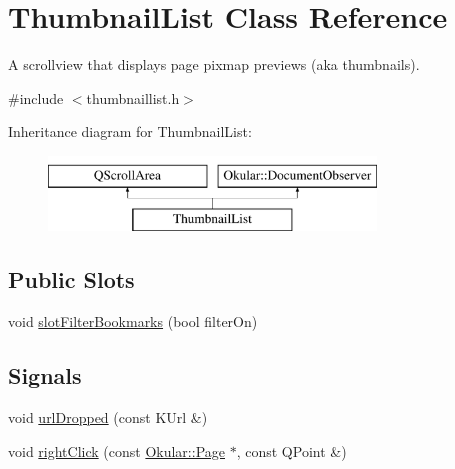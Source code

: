 \hypertarget{classThumbnailList}{\section{Thumbnail\+List Class Reference}
\label{classThumbnailList}
}


A scrollview that displays page pixmap previews (aka thumbnails).  




{\ttfamily \#include $<$thumbnaillist.\+h$>$}

Inheritance diagram for Thumbnail\+List\+:\begin{figure}[H]
\begin{center}
\leavevmode
\includegraphics[height=2.000000cm]{classThumbnailList}
\end{center}
\end{figure}
\subsection*{Public Slots}
\begin{DoxyCompactItemize}
\item 
void \hyperlink{classThumbnailList_aa87ec39d6085e009402f560e01f86a09}{slot\+Filter\+Bookmarks} (bool filter\+On)
\end{DoxyCompactItemize}
\subsection*{Signals}
\begin{DoxyCompactItemize}
\item 
void \hyperlink{classThumbnailList_ae23ce1aaf766a0633cbee9d8c8185903}{url\+Dropped} (const K\+Url \&)
\item 
void \hyperlink{classThumbnailList_af73fbc70ddd6bb5551594883548c4251}{right\+Click} (const \hyperlink{classOkular_1_1Page}{Okular\+::\+Page} $\ast$, const Q\+Point \&)
\end{DoxyCompactItemize}
